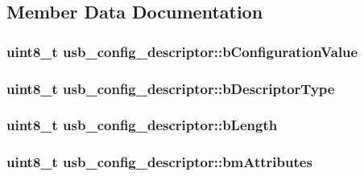\subsection{Member Data Documentation}
\hypertarget{structusb__config__descriptor_af50d14a1e97dab1a4483f03b969ca431}{
\subsubsection[{b\-Configuration\-Value}]{\setlength{\rightskip}{0pt plus 5cm}uint8\-\_\-t usb\-\_\-config\-\_\-descriptor\-::b\-Configuration\-Value}}\label{structusb__config__descriptor_af50d14a1e97dab1a4483f03b969ca431}
\hypertarget{structusb__config__descriptor_a69b0a0fe8f2f9152f299a333f352982e}{
\subsubsection[{b\-Descriptor\-Type}]{\setlength{\rightskip}{0pt plus 5cm}uint8\-\_\-t usb\-\_\-config\-\_\-descriptor\-::b\-Descriptor\-Type}}\label{structusb__config__descriptor_a69b0a0fe8f2f9152f299a333f352982e}
\hypertarget{structusb__config__descriptor_aaa38eade89cca96312968258eaeade9d}{
\subsubsection[{b\-Length}]{\setlength{\rightskip}{0pt plus 5cm}uint8\-\_\-t usb\-\_\-config\-\_\-descriptor\-::b\-Length}}\label{structusb__config__descriptor_aaa38eade89cca96312968258eaeade9d}
\hypertarget{structusb__config__descriptor_aa46182c4bc520e2c60a83c84d80d1e23}{
\subsubsection[{bm\-Attributes}]{\setlength{\rightskip}{0pt plus 5cm}uint8\-\_\-t usb\-\_\-config\-\_\-descriptor\-::bm\-Attributes}}\label{structusb__config__descriptor_aa46182c4bc520e2c60a83c84d80d1e23}
